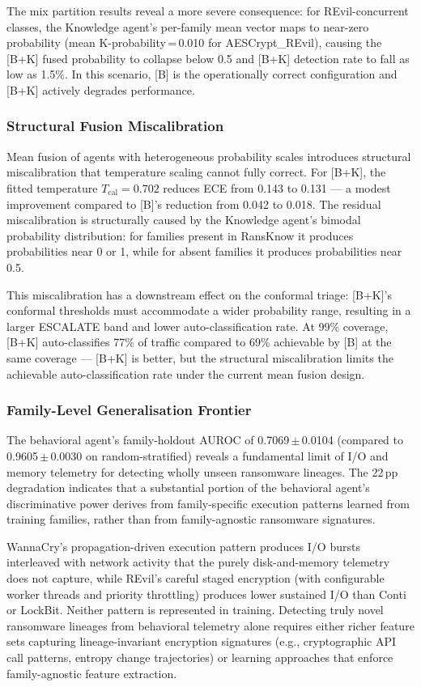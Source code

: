 \documentclass[journal]{IEEEtran}
\begin{document}
The mix partition results reveal a more severe consequence: for REvil-concurrent classes,
the Knowledge agent's per-family mean vector maps to near-zero probability
(mean K-probability\,=\,0.010 for AESCrypt\_REvil), causing the [B+K] fused probability
to collapse below 0.5 and [B+K] detection rate to fall as low as 1.5\%.
In this scenario, [B] is the operationally correct configuration and [B+K] actively
degrades performance.

\subsubsection{Structural Fusion Miscalibration}

Mean fusion of agents with heterogeneous probability scales introduces structural
miscalibration that temperature scaling cannot fully correct.
For [B+K], the fitted temperature $T_{\mathrm{cal}} = 0.702$ reduces ECE from 0.143 to
0.131 --- a modest improvement compared to [B]'s reduction from 0.042 to 0.018.
The residual miscalibration is structurally caused by the Knowledge agent's bimodal
probability distribution: for families present in RansKnow it produces probabilities near
0 or 1, while for absent families it produces probabilities near 0.5.

This miscalibration has a downstream effect on the conformal triage: [B+K]'s conformal
thresholds must accommodate a wider probability range, resulting in a larger ESCALATE band
and lower auto-classification rate.
At 99\% coverage, [B+K] auto-classifies 77\% of traffic compared to 69\% achievable by
[B] at the same coverage --- [B+K] is better, but the structural miscalibration limits the
achievable auto-classification rate under the current mean fusion design.

\subsubsection{Family-Level Generalisation Frontier}

The behavioral agent's family-holdout AUROC of 0.7069\,$\pm$\,0.0104 (compared to
0.9605\,$\pm$\,0.0030 on random-stratified) reveals a fundamental limit of I/O and memory
telemetry for detecting wholly unseen ransomware lineages.
The 22\,pp degradation indicates that a substantial portion of the behavioral agent's
discriminative power derives from family-specific execution patterns learned from training
families, rather than from family-agnostic ransomware signatures.

WannaCry's propagation-driven execution pattern produces I/O bursts interleaved with
network activity that the purely disk-and-memory telemetry does not capture, while REvil's
careful staged encryption (with configurable worker threads and priority throttling)
produces lower sustained I/O than Conti or LockBit.
Neither pattern is represented in training.
Detecting truly novel ransomware lineages from behavioral telemetry alone requires either
richer feature sets capturing lineage-invariant encryption signatures (e.g., cryptographic
API call patterns, entropy change trajectories) or learning approaches that enforce
family-agnostic feature extraction.
\end{document}
